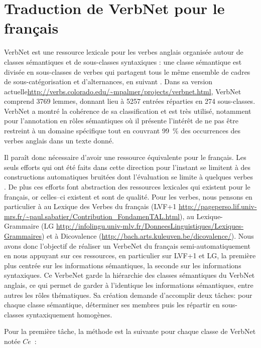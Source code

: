 \chapter{Traduction de VerbNet pour le français}
\label{ch:verbnet}

VerbNet est une ressource lexicale pour les verbes anglais organisée autour de
classes sémantiques et de sous-classes syntaxiques : une classe sémantique est
divisée en sous-classes de verbes qui partagent tous le même ensemble de cadres
de sous-catégorisation et d'alternances, en suivant \cite{levin1993english}.
Dans sa version
actuelle\url{http://verbs.colorado.edu/~mpalmer/projects/verbnet.html}, VerbNet
comprend 3769 lemmes, donnant lieu à 5257 entrées réparties en 274
sous-classes. VerbNet a montré la cohérence de sa classification et est très
utilisé, notamment pour l'annotation en rôles sémantiques
\citep{swier2005exploiting, palmer2013semantic} où il présente l'intérêt de ne
pas être restreint à un domaine spécifique tout en couvrant 99~\% des
occurrences des verbes anglais dans un texte donné.

Il paraît donc nécessaire d'avoir une ressource équivalente pour le français.
Les seuls efforts qui ont été faits dans cette direction pour l'instant se
limitent à des constructions automatiques bruitées dont l'évaluation se limite
à quelques verbes \citep{messiant2010acquisition,falk2012classifying}. De plus
ces efforts font abstraction des ressources lexicales qui existent pour le
français, or celles–ci existent et sont de qualité. Pour les verbes, nous
pensons en particulier à au Lexique des Verbes du français (LVF+1
\url{http://pageperso.lif.univ-mrs.fr/~paul.sabatier/Contribution_FondamenTAL.html}),
au Lexique-Grammaire (LG
\url{http://infolingu.univ-mlv.fr/DonneesLinguistiques/Lexiques-Grammaires}) et
à Dicovalence (\url{http://bach.arts.kuleuven.be/dicovalence/}). Nous avons
donc l'objectif de réaliser un VerbeNet du français semi-automatiquement en
nous appuyant sur ces ressources, en particulier sur LVF+1 et LG, la première
plus centrée sur les informations sémantiques, la seconde sur les informations
syntaxiques. Ce VerbeNet garde la hiérarchie des classes sémantiques du VerbNet
anglais, ce qui permet de garder à l'identique les informations sémantiques,
entre autres les rôles thématiques. Sa création demande d'accomplir deux
tâches: pour chaque classe sémantique, déterminer ses membres puis les répartir
en sous-classes syntaxiquement homogènes.

Pour la première tâche, la méthode est la suivante pour chaque classe de
VerbNet notée $Ce$~:

